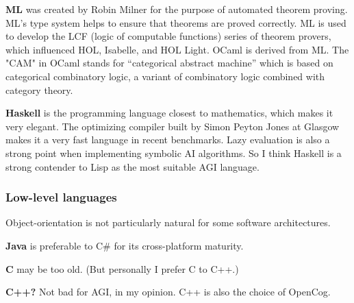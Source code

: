 \textbf{ML} was created by Robin Milner for the purpose of automated theorem proving.  ML's type system helps to ensure that theorems are proved correctly.  ML is used to develop the LCF (logic of computable functions) series of theorem provers, which influenced HOL, Isabelle, and HOL Light.  OCaml is derived from ML.  The "CAM" in OCaml stands for ``categorical abstract machine'' which is based on categorical combinatory logic, a variant of combinatory logic combined with category theory.

\textbf{Haskell} is the programming language closest to mathematics, which makes it very elegant.  The optimizing compiler built by Simon Peyton Jones at Glasgow makes it a very fast language in recent benchmarks.  Lazy evaluation is also a strong point when implementing symbolic AI algorithms.  So I think Haskell is a strong contender to Lisp as the most suitable AGI language.

\subsubsection{Low-level languages}

Object-orientation is not particularly natural for some software architectures.

\textbf{Java} is preferable to C\# for its cross-platform maturity.

\textbf{C} may be too old.  (But personally I prefer C to C++.)

\textbf{C++?}  Not bad for AGI, in my opinion.  C++ is also the choice of OpenCog.
